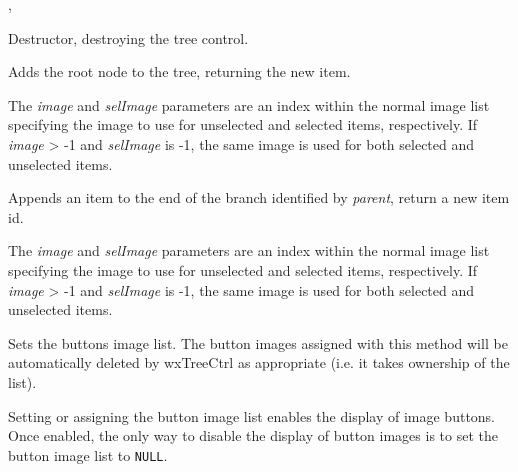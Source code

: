 
, 


\label{wxtreectrldtor}


Destructor, destroying the tree control.


\label{wxtreectrladdroot}


Adds the root node to the tree, returning the new item.

The {\it image} and {\it selImage} parameters are an index within
the normal image list specifying the image to use for unselected and
selected items, respectively.
If {\it image} > -1 and {\it selImage} is -1, the same image is used for
both selected and unselected items.


\label{wxtreectrlappenditem}


Appends an item to the end of the branch identified by {\it parent}, return a new item id.

The {\it image} and {\it selImage} parameters are an index within
the normal image list specifying the image to use for unselected and
selected items, respectively.
If {\it image} > -1 and {\it selImage} is -1, the same image is used for
both selected and unselected items.


\label{wxtreectrlassignbuttonsimagelist}


Sets the buttons image list. The button images assigned with this method will
be automatically deleted by wxTreeCtrl as appropriate
(i.e. it takes ownership of the list).

Setting or assigning the button image list enables the display of image buttons.
Once enabled, the only way to disable the display of button images is to set
the button image list to {\tt NULL}.

